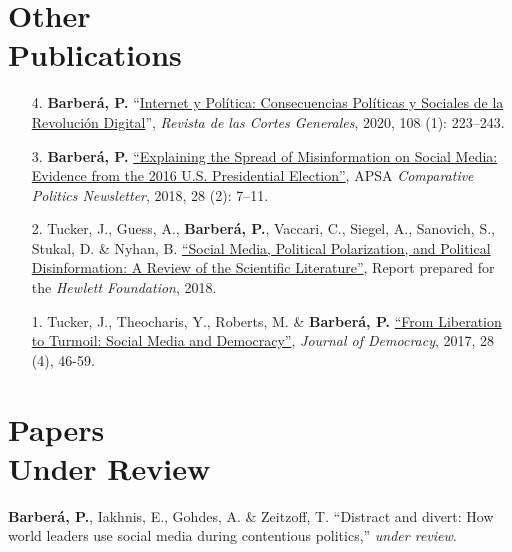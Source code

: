 \documentclass[margin,line,11pt]{resume}
\begin{document}
\begin{resume}
\section{\mysidestyle Other\\Publications}
    \vspace{.15cm}    
\begin{itemize}[leftmargin=5.5mm]
\item[4.] \textbf{Barber\'{a}, P.} ``\href{https://revista.cortesgenerales.es/rcg/article/view/1486}{Internet y Pol\'{i}tica: Consecuencias Pol\'{i}ticas y Sociales de la Revoluci\'{o}n Digital}'', \textit{Revista de las Cortes Generales}, 2020, 108 (1): 223--243.

\item[3.]  \textbf{Barber\'{a}, P.} \href{http://comparativenewsletter.com/files/archived_newsletters/2018_fall.pdf}{``Explaining the Spread of Misinformation on Social Media: Evidence from the 2016 U.S. Presidential Election''}, APSA \textit{Comparative Politics Newsletter}, 2018, 28 (2): 7--11.

\item[2.]  Tucker, J., Guess, A., \textbf{Barber\'{a}, P.}, Vaccari, C., Siegel, A., Sanovich, S., Stukal, D. \& Nyhan, B. \href{https://www.hewlett.org/library/social-media-political-polarization-political-disinformation-review-scientific-literature/}{``Social Media, Political Polarization, and Political Disinformation: A Review of the Scientific Literature''}, Report prepared for the \textit{Hewlett Foundation}, 2018.   

\item[1.]  Tucker, J., Theocharis, Y., Roberts, M. \& \textbf{Barber\'{a}, P.} \href{https://muse.jhu.edu/article/671987/pdf}{``From Liberation to Turmoil: Social Media and Democracy''}, \textit{Journal of Democracy}, 2017, 28 (4), 46-59.   
\end{itemize}     
    

    \section{\mysidestyle Papers \\ Under Review} 


\textbf{Barber\'{a}, P.}, Iakhnis, E., Gohdes, A. \& Zeitzoff, T. ``Distract and divert: How world leaders use social media during contentious politics,'' \textit{under review}.


\end{resume}
\end{document}
